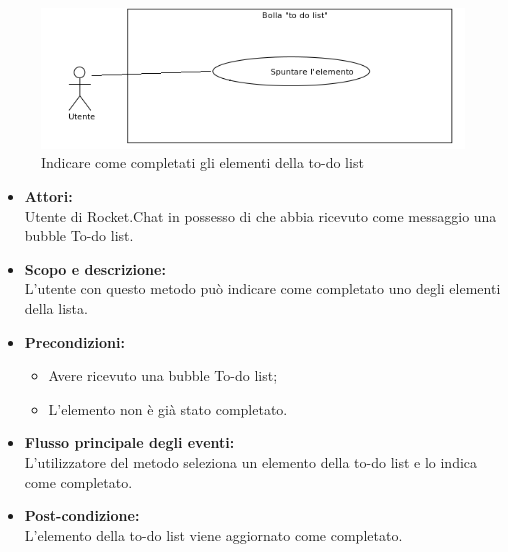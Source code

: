 
\begin{figure}[H]
	\centering
	\includegraphics[width=15cm]{../../documenti/AnalisiDeiRequisiti/Diagrammi_img/uc2_3.png}
	\caption{\UCCaption{} Indicare come completati gli elementi della to-do list}
\end{figure}

\begin{itemize}
	\item \textbf{Attori:}
	\\Utente di Rocket.Chat in possesso di \ProjectName{} che abbia ricevuto come messaggio una bubble To-do list.
	\item \textbf{Scopo e descrizione:} 
	\\L'utente con questo metodo può indicare come completato uno degli elementi della lista.
	\item \textbf{Precondizioni:}
	\begin{itemize}
		\item Avere ricevuto una bubble To-do list;
		\item L'elemento non è già stato completato.
	\end{itemize}
	\item \textbf{Flusso principale degli eventi:}
	\\L'utilizzatore del metodo seleziona un elemento della to-do list e lo indica come completato. 
	\item \textbf{Post-condizione:}
	\\L'elemento della to-do list viene aggiornato come completato.
\end{itemize}



